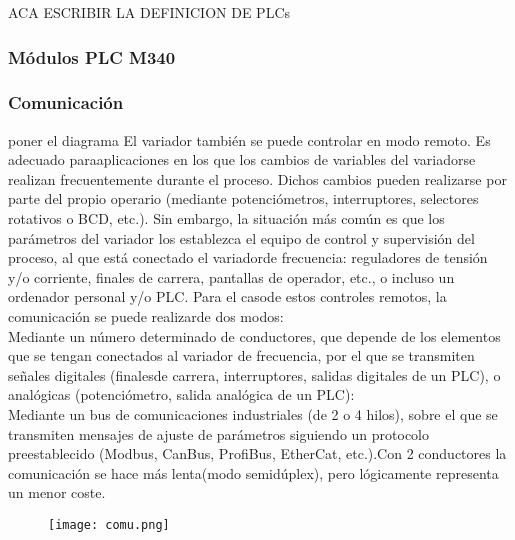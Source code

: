 \begin{tcolorbox}[colback=blue!5!white,colframe=blue!75!black,title=Definición]
	ACA ESCRIBIR LA DEFINICION DE PLCs
\end{tcolorbox}

\subsubsection{Módulos PLC M340}



\subsubsection{Comunicación}
poner el diagrama
%
El   variador   también   se   puede   controlar   en   modo   remoto.   Es   adecuado   paraaplicaciones en   los   que   los   cambios   de   variables   del   variadorse   realizan frecuentemente  durante  el proceso.  Dichos  cambios  pueden  realizarse  por  parte  del propio  operario  (mediante  potenciómetros,  interruptores,  selectores  rotativos  o  BCD, etc.).  Sin  embargo,  la  situación  más  común  es  que  los  parámetros  del  variador  los establezca  el  equipo  de  control  y  supervisión  del  proceso,  al  que  está  conectado  el variadorde  frecuencia: reguladores  de  tensión  y/o  corriente,  finales  de  carrera, pantallas de operador, etc., o incluso un ordenador personal y/o PLC. Para  el  casode  estos  controles  remotos,  la  comunicación  se  puede  realizarde  dos modos:\\Mediante un  número  determinado  de  conductores,  que  depende  de  los elementos que se tengan conectados al variador de frecuencia, por el que se transmiten señales digitales (finalesde carrera, interruptores, salidas digitales de un PLC), o analógicas (potenciómetro, salida analógica de un PLC):\\Mediante un bus de comunicaciones industriales (de 2 o 4 hilos), sobre el que se transmiten   mensajes   de   ajuste   de   parámetros   siguiendo   un   protocolo preestablecido (Modbus, CanBus, ProfiBus, EtherCat, etc.).Con 2  conductores la  comunicación  se  hace  más  lenta(modo  semidúplex),  pero  lógicamente representa un menor coste.
	
	\begin{figure}[htb]
		\centering
		\texttt{[image: comu.png]}
	\end{figure}	
	

